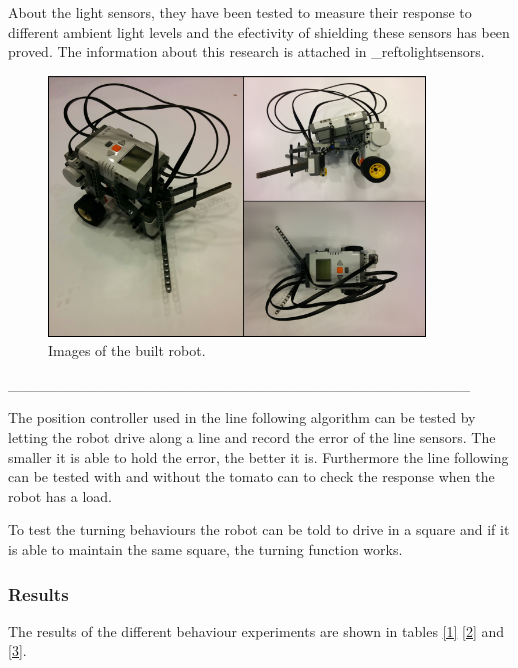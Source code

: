 About the light sensors, they have been tested to measure their response to different ambient light levels and the efectivity of shielding these sensors has been proved.
The information about this research is attached in \_reftolightsensors.


\begin{figure}[H]
\includegraphics[width=10cm]{Fig1.png}
\centering
\caption{Images of the built robot.}
\label{fig:testMaps}
\end{figure}


\_\_\_\_\_\_\_\_\_\_\_\_\_\_\_\_\_\_\_\_\_\_\_\_\_\_\_\_\_\_\_\_\_\_\_\_\_\_\_\_\_\_\_\_

The position controller used in the line following algorithm can be tested by letting the robot drive along a line and record the error of the line sensors.
The smaller it is able to hold the error, the better it is.
Furthermore the line following can be tested with and without the tomato can to check the response when the robot has a load.

To test the turning behaviours the robot can be told to drive in a square and if it is able to maintain the same square, the turning function works.


\subsubsection{Results}

The results of the different behaviour experiments are shown in tables \ref{1} \ref{2} and \ref{3}.


